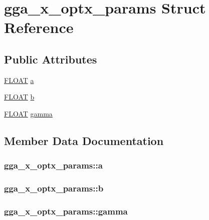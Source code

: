 \hypertarget{structgga__x__optx__params}{\section{gga\-\_\-x\-\_\-optx\-\_\-params Struct Reference}
\label{structgga__x__optx__params}
}
\subsection*{Public Attributes}
\begin{DoxyCompactItemize}
\item 
\hyperlink{src_2xc__config_8h_ae8690abbffa85934d64d545920e2b108}{F\-L\-O\-A\-T} \hyperlink{structgga__x__optx__params_ada20f808ae1b9a7c57c747e2ca9e78b9}{a}
\item 
\hyperlink{src_2xc__config_8h_ae8690abbffa85934d64d545920e2b108}{F\-L\-O\-A\-T} \hyperlink{structgga__x__optx__params_a3e536ea259e2d658d4e69d07db964bb3}{b}
\item 
\hyperlink{src_2xc__config_8h_ae8690abbffa85934d64d545920e2b108}{F\-L\-O\-A\-T} \hyperlink{structgga__x__optx__params_a9378bc7bf4f48e7a521b0e9158d4e93f}{gamma}
\end{DoxyCompactItemize}


\subsection{Member Data Documentation}
\hypertarget{structgga__x__optx__params_ada20f808ae1b9a7c57c747e2ca9e78b9}{
\subsubsection[{a}]{ gga\-\_\-x\-\_\-optx\-\_\-params\-::a}}\label{structgga__x__optx__params_ada20f808ae1b9a7c57c747e2ca9e78b9}
\hypertarget{structgga__x__optx__params_a3e536ea259e2d658d4e69d07db964bb3}{
\subsubsection[{b}]{ gga\-\_\-x\-\_\-optx\-\_\-params\-::b}}\label{structgga__x__optx__params_a3e536ea259e2d658d4e69d07db964bb3}
\hypertarget{structgga__x__optx__params_a9378bc7bf4f48e7a521b0e9158d4e93f}{
\subsubsection[{gamma}]{ gga\-\_\-x\-\_\-optx\-\_\-params\-::gamma}}\label{structgga__x__optx__params_a9378bc7bf4f48e7a521b0e9158d4e93f}


